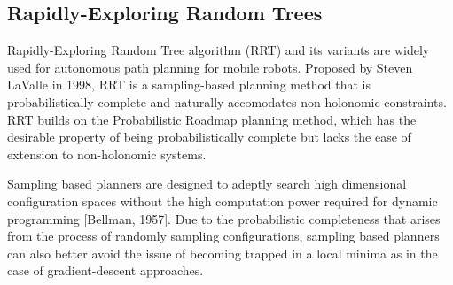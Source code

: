 \documentclass[12pt]{article}
\begin{document}
    \subsection{Rapidly-Exploring Random Trees}
        Rapidly-Exploring Random Tree algorithm (RRT) and its variants are widely used for autonomous path planning for mobile robots. Proposed by Steven LaValle in 1998, RRT is a sampling-based planning method that is probabilistically complete and naturally accomodates non-holonomic constraints. RRT builds on the Probabilistic Roadmap planning method, which has the desirable property of being probabilistically complete but lacks the ease of extension to non-holonomic systems. 
        \par Sampling based planners are designed to adeptly search high dimensional configuration spaces without the high computation power required for dynamic programming [Bellman, 1957]. Due to the probabilistic completeness that arises from the process of randomly sampling configurations, sampling based planners can also better avoid the issue of becoming trapped in a local minima as in the case of gradient-descent approaches.
\end{document}
